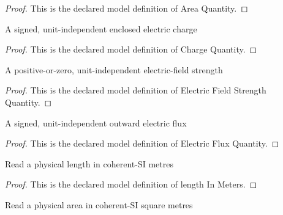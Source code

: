 \begin{proof}
  This is the declared model definition of Area Quantity.
\end{proof}
\begin{definition}
  \label{def:physics:phyx-mini-0842:phyxminiproblems-problemphyxmini0842-chargequantity}
  A signed, unit-independent enclosed electric charge
\end{definition}
\begin{proof}
  This is the declared model definition of Charge Quantity.
\end{proof}
\begin{definition}
  \label{def:physics:phyx-mini-0842:phyxminiproblems-problemphyxmini0842-electricfieldstrengthquantity}
  A positive-or-zero, unit-independent electric-field strength
\end{definition}
\begin{proof}
  This is the declared model definition of Electric Field Strength Quantity.
\end{proof}
\begin{definition}
  \label{def:physics:phyx-mini-0842:phyxminiproblems-problemphyxmini0842-electricfluxquantity}
  A signed, unit-independent outward electric flux
\end{definition}
\begin{proof}
  This is the declared model definition of Electric Flux Quantity.
\end{proof}
\begin{definition}
  \label{def:physics:phyx-mini-0842:phyxminiproblems-problemphyxmini0842-lengthinmeters}
  Read a physical length in coherent-SI metres
\end{definition}
\begin{proof}
  This is the declared model definition of length In Meters.
\end{proof}
\begin{definition}
  \label{def:physics:phyx-mini-0842:phyxminiproblems-problemphyxmini0842-areainsquaremeters}
  Read a physical area in coherent-SI square metres
\end{definition}
